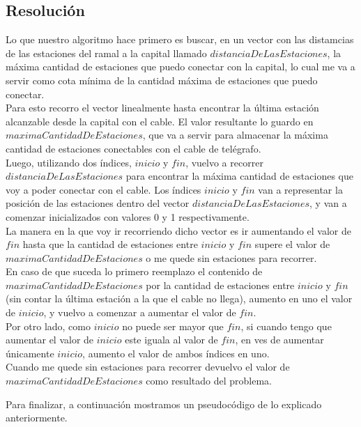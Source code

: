 \documentclass[10pt, a4paper]{article}
\begin{document}
\subsection{Resoluci\'on}
Lo que nuestro algoritmo hace primero es buscar, en un vector con las distamcias de las estaciones del ramal a la capital llamado $distanciaDeLasEstaciones$, la m\'axima cantidad de estaciones que puedo conectar con la capital, lo cual me va a servir como cota m\'inima de la cantidad m\'axima de estaciones que puedo conectar. \\Para esto recorro el vector linealmente hasta encontrar la \'ultima estaci\'on alcanzable desde la capital con el cable. El valor resultante lo guardo en $maximaCantidadDeEstaciones$, que va a servir para almacenar la m\'axima cantidad de estaciones conectables con el cable de tel\'egrafo.\\
Luego, utilizando dos \'indices, $inicio$ y $fin$, vuelvo a recorrer $distanciaDeLasEstaciones$ para encontrar la m\'axima cantidad de estaciones que voy a poder conectar con el cable. Los \'indices $inicio$ y $fin$ van a representar la posici\'on de las estaciones dentro del vector $distanciaDeLasEstaciones$, y van a comenzar inicializados con valores 0 y 1 respectivamente. \\La manera en la que voy ir recorriendo dicho vector es ir aumentando el valor de $fin$ hasta que la cantidad de estaciones entre $inicio$ y $fin$ supere el valor de $maximaCantidadDeEstaciones$ o me quede sin estaciones para recorrer.\\
En caso de que suceda lo primero reemplazo el contenido de $maximaCantidadDeEstaciones$ por la cantidad de estaciones entre $inicio$ y $fin$(sin contar la \'ultima estaci\'on a la que el cable no llega), aumento en uno el valor de $inicio$, y vuelvo a comenzar a aumentar el valor de $fin$.\\ 
Por otro lado, como $inicio$ no puede ser mayor que $fin$, si cuando tengo que aumentar el valor de $inicio$ este iguala al valor de $fin$, en ves de aumentar \'unicamente $inicio$, aumento el valor de ambos \'indices en uno.\\
Cuando me quede sin estaciones para recorrer devuelvo el valor de $maximaCantidadDeEstaciones$ como resultado del problema.\\
\begin{flushleft}
Para finalizar, a continuaci\'on mostramos un pseudoc\'odigo de lo explicado anteriormente.
\end{flushleft}
\end{document}
